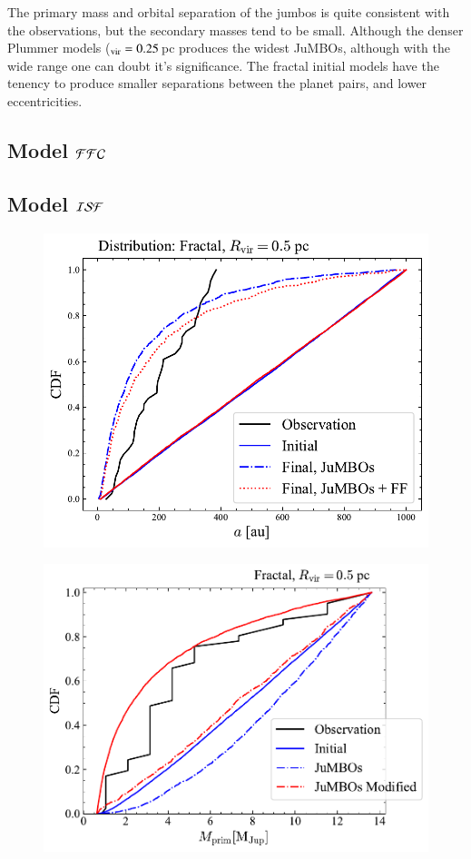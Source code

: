 \documentclass[aa]{lib/aa}
\newcommand{\jumbos}{\mbox{JuMBOs}}
\begin{document}
The primary mass and orbital separation of the jumbos is quite
consistent with the observations, but the secondary masses tend to be
small. Although the denser Plummer models ($_{\rm vir} = 0.25$\,pc
produces the widest \jumbos, although with the wide range one can
doubt it's significance. The fractal initial models have the tenency
to produce smaller separations between the planet pairs, and lower
eccentricities.

\subsection{Model ${\cal FFC}$}

\subsection{Model ${\cal ISF}$}

\begin{figure}
    \centering
        \includegraphics[width=.91\columnwidth]{figures/sem_axis_Fractal_FF.pdf}
        \caption{}
         \label{Fig:Fr_semimajor_axis}
\end{figure}

\begin{figure}
    \centering
        \includegraphics[width=.91\columnwidth]{figures/mprim_vs_obs_Fractal0.5Mod.pdf}
        \caption{}
         \label{Fig:Fr_primar_mass}
\end{figure}
\end{document}
